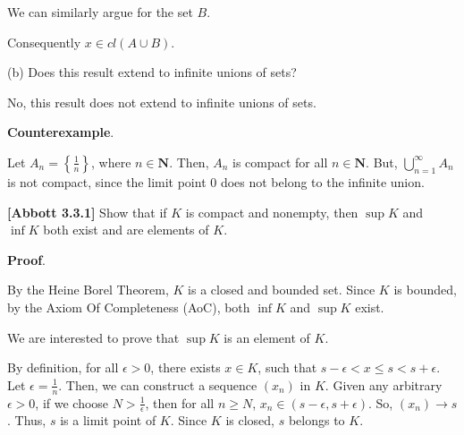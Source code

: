 \documentclass[10pt]{article}
\begin{document}
We can similarly argue for the set $\displaystyle B.$



Consequently $\displaystyle x\in cl( A\cup B)$.



(b) Does this result extend to infinite unions of sets?



No, this result does not extend to infinite unions of sets.



\textbf{Counterexample}.



Let $\displaystyle A_{n} =\left\{\frac{1}{n}\right\}$, where $\displaystyle n\in \mathbf{N}$. Then, $\displaystyle A_{n}$ is compact for all $\displaystyle n\in \mathbf{N}$. But, $\displaystyle \bigcup _{n=1}^{\infty } A_{n}$ is not compact, since the limit point $\displaystyle 0$ does not belong to the infinite union.



\textbf{[Abbott 3.3.1] }Show that if $\displaystyle K$ is compact and nonempty, then $\displaystyle \sup K$ and $\displaystyle \inf K$ both exist and are elements of $\displaystyle K$.



\textbf{Proof}.



By the Heine Borel Theorem, $\displaystyle K$ is a closed and bounded set. Since $\displaystyle K$ is bounded, by the Axiom Of Completeness (AoC), both $\displaystyle \inf K$ and $\displaystyle \sup K$ exist. 



We are interested to prove that $\displaystyle \sup K$ is an element of $\displaystyle K$.



By definition, for all $\displaystyle \epsilon  >0$, there exists $\displaystyle x\in K$, such that $\displaystyle s-\epsilon < x\leq s< s+\epsilon $. Let $\displaystyle \epsilon =\frac{1}{n}$. Then, we can construct a sequence $\displaystyle ( x_{n})$ in $\displaystyle K$. Given any arbitrary $\displaystyle \epsilon  >0$, if we choose $\displaystyle N >\frac{1}{\epsilon }$, then for all $\displaystyle n\geq N$, $\displaystyle x_{n} \in ( s-\epsilon ,s+\epsilon )$. So, $\displaystyle ( x_{n})\rightarrow s$. Thus, $\displaystyle s$ is a limit point of $\displaystyle K$. Since $\displaystyle K$ is closed, $\displaystyle s$ belongs to $\displaystyle K$.
\end{document}
